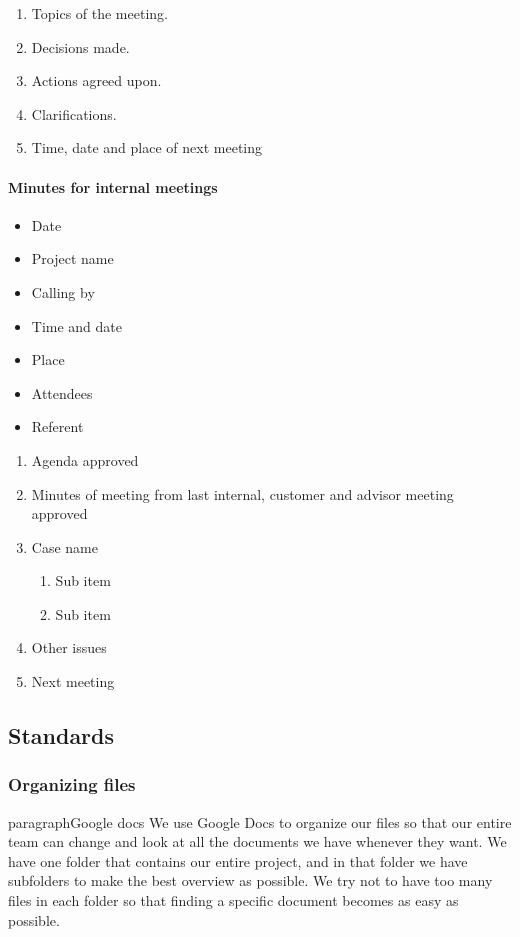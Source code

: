 \begin{enumerate}
\item{}Topics of the meeting.
\item{}Decisions made.
\item{}Actions agreed upon.
\item{}Clarifications.
\item{}Time, date and place of next meeting
\end{enumerate}

\paragraph{Minutes for internal meetings} \hfill
\begin{itemize}
\item{}Date
\item{}Project name
\item{}Calling by
\item{}Time and date 
\item{}Place 
\item{}Attendees 
\item{}Referent
\end{itemize}

\begin{enumerate}
\item{}Agenda approved
\item{}Minutes of meeting from last internal, customer and advisor meeting approved
\item{}Case name
\begin{enumerate}
\item{}Sub item
\item{}Sub item
\end{enumerate}
\item{}Other issues
\item{}Next meeting
\end{enumerate}

\subsection{Standards}

\subsubsection{Organizing files}
paragraph{Google docs}\hfill
 We use Google Docs to organize our files so that our entire team can change and look at all the documents we have whenever they want. We have one folder that contains our entire project, and in that folder we have subfolders to make the best overview as possible. We try not to have too many files in each folder so that finding a specific document becomes as easy as possible.

